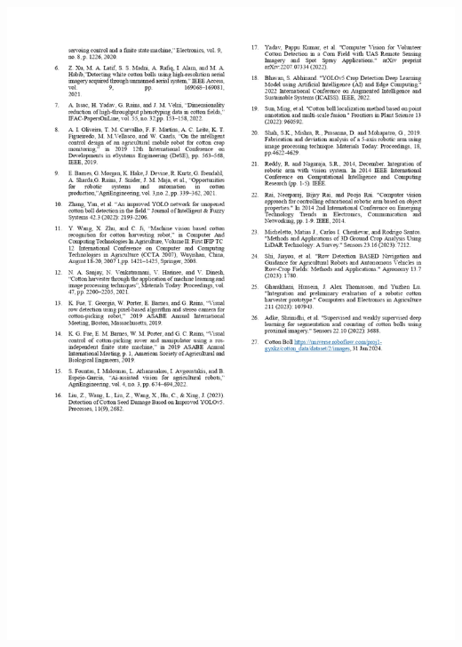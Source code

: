 \documentclass[12pt,a4paper]{report}
\begin{document}
\includegraphics[scale=0.7]{images/copyright/publication/Publication/Publication_page-0007.jpg}
\newpage
\end{document}
